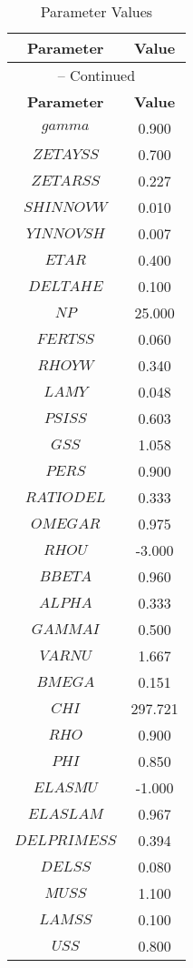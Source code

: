\begin{center}
\begin{longtable}{cc}
\caption{Parameter Values}\\%
\toprule%
\multicolumn{1}{c}{\textbf{Parameter}} &
\multicolumn{1}{c}{\textbf{Value}}  \\%
\midrule%
\endfirsthead
\multicolumn{2}{c}{{\tablename} \thetable{} -- Continued}\\%
\midrule%
\multicolumn{1}{c}{\textbf{Parameter}} &
\multicolumn{1}{c}{\textbf{Value}} \\%
\midrule%
\endhead
$gamma$ 	 & 	 0.900 \\
$ZETAYSS$ 	 & 	 0.700 \\
$ZETARSS$ 	 & 	 0.227 \\
$SHINNOVW$ 	 & 	 0.010 \\
$YINNOVSH$ 	 & 	 0.007 \\
$ETAR$ 	 & 	 0.400 \\
$DELTAHE$ 	 & 	 0.100 \\
$NP$ 	 & 	 25.000 \\
$FERTSS$ 	 & 	 0.060 \\
$RHOYW$ 	 & 	 0.340 \\
$LAMY$ 	 & 	 0.048 \\
$PSISS$ 	 & 	 0.603 \\
$GSS$ 	 & 	 1.058 \\
$PERS$ 	 & 	 0.900 \\
$RATIODEL$ 	 & 	 0.333 \\
$OMEGAR$ 	 & 	 0.975 \\
$RHOU$ 	 & 	 -3.000 \\
$BBETA$ 	 & 	 0.960 \\
$ALPHA$ 	 & 	 0.333 \\
$GAMMAI$ 	 & 	 0.500 \\
$VARNU$ 	 & 	 1.667 \\
$BMEGA$ 	 & 	 0.151 \\
$CHI$ 	 & 	 297.721 \\
$RHO$ 	 & 	 0.900 \\
$PHI$ 	 & 	 0.850 \\
$ELASMU$ 	 & 	 -1.000 \\
$ELASLAM$ 	 & 	 0.967 \\
$DELPRIMESS$ 	 & 	 0.394 \\
$DELSS$ 	 & 	 0.080 \\
$MUSS$ 	 & 	 1.100 \\
$LAMSS$ 	 & 	 0.100 \\
$USS$ 	 & 	 0.800 \\

\end{longtable}
\end{center}
